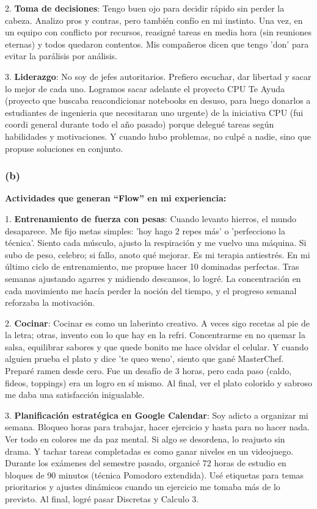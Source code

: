 \documentclass[12pt]{article}
\begin{document}
2. \textbf{Toma de decisiones}: Tengo buen ojo para decidir rápido sin perder la cabeza. Analizo pros y contras, pero también confío en mi instinto. Una vez, en un equipo con conflicto por recursos, reasigné tareas en media hora (sin reuniones eternas) y todos quedaron contentos. Mis compañeros dicen que tengo 'don' para evitar la parálisis por análisis.  

3. \textbf{Liderazgo}: No soy de jefes autoritarios. Prefiero escuchar, dar libertad y sacar lo mejor de cada uno. Logramos sacar adelante el proyecto CPU Te Ayuda (proyecto que buscaba reacondicionar notebooks en desuso, para luego donarlos a estudiantes de ingenieria que necesitaran uno urgente) de la iniciativa CPU (fui coordi general durante todo el año pasado) porque delegué tareas según habilidades y motivaciones. Y cuando hubo problemas, no culpé a nadie, sino que propuse soluciones en conjunto.

\subsubsection*{(b)}  

\textbf{Actividades que generan ``Flow'' en mi experiencia:}  

1. \textbf{Entrenamiento de fuerza con pesas}: Cuando levanto hierros, el mundo desaparece. Me fijo metas simples: 'hoy hago 2 repes más' o 'perfecciono la técnica'. Siento cada músculo, ajusto la respiración y me vuelvo una máquina. Si subo de peso, celebro; si fallo, anoto qué mejorar. Es mi terapia antiestrés. En mi último ciclo de entrenamiento, me propuse hacer 10 dominadas perfectas. Tras semanas ajustando agarres y midiendo descansos, lo logré. La concentración en cada movimiento me hacía perder la noción del tiempo, y el progreso semanal reforzaba la motivación.  

2. \textbf{Cocinar}: Cocinar es como un laberinto creativo. A veces sigo recetas al pie de la letra; otras, invento con lo que hay en la refri. Concentrarme en no quemar la salsa, equilibrar sabores y que quede bonito me hace olvidar el celular. Y cuando alguien prueba el plato y dice 'te queo weno', siento que gané MasterChef. Preparé ramen desde cero. Fue un desafío de 3 horas, pero cada paso (caldo, fideos, toppings) era un logro en sí mismo. 
Al final, ver el plato colorido y sabroso me daba una satisfacción inigualable.  

3. \textbf{Planificación estratégica en Google Calendar}: Soy adicto a organizar mi semana. Bloqueo horas para trabajar, hacer ejercicio y hasta para no hacer nada. Ver todo en colores me da paz mental. Si algo se desordena, lo reajusto sin drama. Y tachar tareas completadas es como ganar niveles en un videojuego. Durante los exámenes del semestre pasado, organicé 72 horas de estudio en bloques de 90 minutos (técnica Pomodoro extendida). Usé etiquetas para temas prioritarios y ajustes dinámicos cuando un ejercicio me tomaba más de lo previsto. Al final, logré pasar Discretas y Calculo 3.
\end{document}
